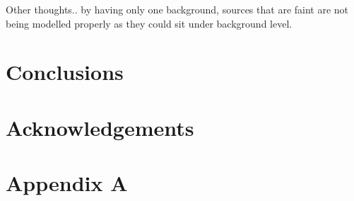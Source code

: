 \documentclass[useAMS,usenatbib]{mn2e}
\begin{document}
Other thoughts.. by having only one background, sources that are faint are not being modelled properly as they could sit under background level.
\section{Conclusions}



\section*{Acknowledgements} %
%
%
%

\appendix
\section*{Appendix A}\label{Stan_model}
\onecolumn

%
%
%
%
%
%
%
\end{document}
